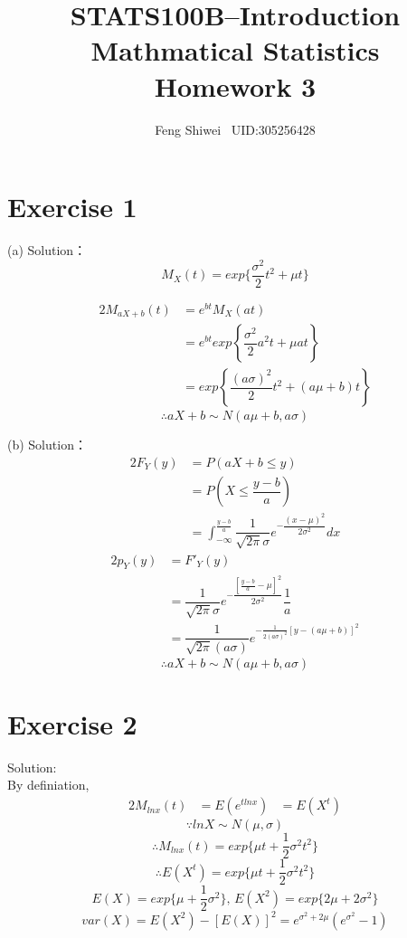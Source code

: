 \documentclass[a4papers]{ctexart}
\title{STATS100B--Introduction Mathmatical Statistics \\Homework 3}
\author{Feng Shiwei \ UID:305256428}
\date{}
\begin{document}
\maketitle
\section*{Exercise 1}
\noindent (a) Solution：\\
\indent 
\[ M_X(t) = exp\{{\dfrac{\sigma^2}{2}t^2+\mu t}\}  \]

\begin{alignat*}{2}
    M_{aX+b}\left( t\right) &=e^{bt}M_X\left( at\right) \\
    &=e^{bt}exp\left\{ \dfrac {\sigma ^{2}}{2}a^{2}t+\mu at\right\} \\
    &= exp\left\{ \dfrac {\left( a\sigma \right) ^{2}}{2}t^{2}+\left( a\mu +b\right) t\right\} 
\end{alignat*}
\[ \therefore aX+b\sim N(a\mu +b,a\sigma)\]

\noindent (b) Solution：\\
\begin{alignat*}{2}
    F_Y\left( y\right) &= P\left( aX+b\leq y\right) \\
    &= P(X\le\dfrac{y-b}{a}) \\
    &= \int _{-\infty}^{\frac {y-b}{ a}}\dfrac {1}{\sqrt {2\pi}\sigma }e^{-\dfrac {\left( x-\mu \right) ^{2}}{2\sigma ^{2}}}dx
\end{alignat*}
\begin{alignat*}{2}
p_{Y}\left( y\right) &= F'_{Y}\left( y\right)\\
    &=\dfrac {1}{\sqrt {2\pi }\sigma }e^{-\dfrac {\left[ \frac {y-b}{a}-\mu \right] ^{2}}{2\sigma ^{2}}}\dfrac {1}{a}\\
    &=\dfrac {1}{\sqrt {2\pi }\left( a\sigma \right) }e^{-\frac {1}{2\left( a\sigma \right)^2 }\left[ y-\left( a\mu +b\right) \right] ^{2}}
\end{alignat*}
\[
    \therefore aX+b \sim N(a\mu+b,a\sigma)    
\]

\section*{Exercise 2}
\noindent Solution:\\
By definiation, 
\begin{alignat*}{2}
   M_{lnx}(t) &= E(e^{tlnx})
          &= E(X^t)
\end{alignat*}
\[ \because lnX \sim N(\mu,\sigma)\]
\[ \therefore M_{lnx}(t) = exp\{\mu t+\dfrac{1}{2}\sigma^2t^2\} \]
\[ \therefore E(X^t) = exp\{\mu t+\dfrac{1}{2}\sigma^2t^2\} \]
\[ E(X)=exp\{\mu+\dfrac{1}{2}\sigma^2\},\,E(X^2)=exp\{2\mu+2\sigma^2\}\]
\[ var(X) = E(X^2)-[E(X)]^2 = e^{\sigma^2+2\mu}(e^{\sigma^2}-1)\]
\end{document}
